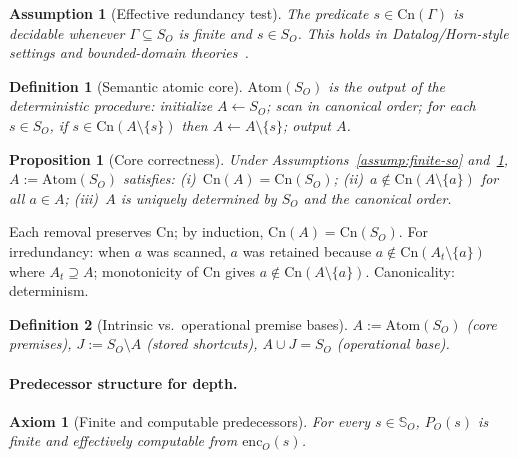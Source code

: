 \documentclass[journal]{IEEEtran}
\makeatletter
\newcommand{\Atom}{\text{Atom}}
\newcommand{\Cn}{\text{Cn}}
\newcommand{\enc}{\text{enc}}
\newtheorem{axiom}{Axiom}[section]
\newtheorem{assumption}{Assumption}[section]
\newtheorem{proposition}{Proposition}[section]
\newtheorem{definition}{Definition}[section]
\numberwithin{equation}{section}
\renewenvironment{proof}[1][\proofname]{\par
  \pushQED{\qed}%
  \normalfont \topsep6\p@\@plus6\p@\relax
  \trivlist
  \item[\hskip\labelsep
        \itshape
    #1\@addpunct{.}]\ignorespaces
}{%
  \popQED\endtrivlist\@endpefalse
}
\makeatother
\begin{document}
\begin{assumption}[Effective redundancy test]
\label{assump:core-extractable}
The predicate $s\in\Cn(\Gamma)$ is decidable whenever
$\Gamma\subseteq S_O$ is finite and $s\in S_O$.
This holds in Datalog/Horn-style settings and bounded-domain
theories~\cite{abiteboul1995foundations,dantsin2001complexity}.
\end{assumption}

\begin{definition}[Semantic atomic core]
\label{def:atom-so}
$\Atom(S_O)$ is the output of the deterministic procedure:
initialize $A\gets S_O$; scan in canonical order; for each
$s\in S_O$, if $s\in\Cn(A\setminus\{s\})$ then
$A\gets A\setminus\{s\}$; output $A$.
\end{definition}

\begin{proposition}[Core correctness]
\label{prop:atom-core-correct}
Under Assumptions~\ref{assump:finite-so}
and~\ref{assump:core-extractable}, $A:=\Atom(S_O)$ satisfies:
\textup{(i)}~$\Cn(A)=\Cn(S_O)$;
\textup{(ii)}~$a\notin\Cn(A\setminus\{a\})$ for all $a\in A$;
\textup{(iii)}~$A$ is uniquely determined by $S_O$ and the
canonical order.
\end{proposition}

\begin{proof}
Each removal preserves $\Cn$; by induction,
$\Cn(A)=\Cn(S_O)$.
For irredundancy: when $a$ was scanned, $a$ was retained because
$a\notin\Cn(A_t\setminus\{a\})$ where $A_t\supseteq A$;
monotonicity of $\Cn$ gives
$a\notin\Cn(A\setminus\{a\})$.
Canonicality: determinism.
\end{proof}

\begin{definition}[Intrinsic vs.\ operational premise bases]
\label{def:intrinsic-operational-bases}
$A:=\Atom(S_O)$ (core premises),
$J:=S_O\setminus A$ (stored shortcuts),
$A\cup J=S_O$ (operational base).
\end{definition}

\paragraph{Predecessor structure for depth.}

\begin{axiom}[Finite and computable predecessors]
\label{ax:finite-predecessors}
For every $s\in\mathbb S_O$, $P_O(s)$ is finite and effectively
computable from $\enc_O(s)$.
\end{axiom}
\end{document}
